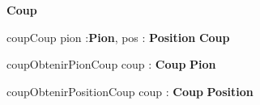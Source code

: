 \begin{algorithme}
  \begin{enregistrement}{\textbf{Coup}}
  \end{enregistrement}
\end{algorithme}

\vspace*{5mm}

\begin{algorithme}
  \small
  \fonction
      {coupCoup}
      {pion :\textbf{Pion}, pos : \textbf{Position}}
      {\textbf{Coup}}
      {}
      {
      }
      
\end{algorithme}

\vspace*{5mm}

\begin{algorithme}
  \small
  \fonction
      {coupObtenirPionCoup}
      {coup : \textbf{Coup}}
      {\textbf{Pion}}
      {}
      {
      }
      
\end{algorithme}

\vspace*{5mm}

\begin{algorithme}
  \small
  \fonction
      {coupObtenirPositionCoup}
      {coup : \textbf{Coup}}
      {\textbf{Position}}
      {}
      {
      }
      
\end{algorithme}
